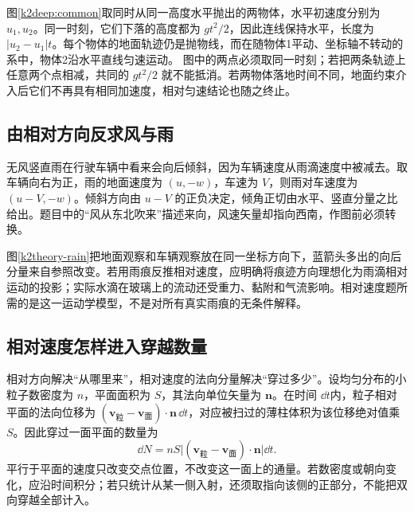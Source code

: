 图\ref{k2deep:common}取同时从同一高度水平抛出的两物体，水平初速度分别为 $u_1,u_2$。同一时刻，它们下落的高度都为 $gt^2/2$，因此连线保持水平，长度为 $|u_2-u_1|t$。每个物体的地面轨迹仍是抛物线，而在随物体1平动、坐标轴不转动的系中，物体2沿水平直线匀速运动。
图中的两点必须取同一时刻；若把两条轨迹上任意两个点相减，共同的 $gt^2/2$ 就不能抵消。若两物体落地时间不同，地面约束介入后它们不再具有相同加速度，相对匀速结论也随之终止。


\subsection{由相对方向反求风与雨}
无风竖直雨在行驶车辆中看来会向后倾斜，因为车辆速度从雨滴速度中被减去。取车辆向右为正，雨的地面速度为 $(u,-w)$，车速为 $V$，则雨对车速度为 $(u-V,-w)$。倾斜方向由 $u-V$ 的正负决定，倾角正切由水平、竖直分量之比给出。题目中的“风从东北吹来”描述来向，风速矢量却指向西南，作图前必须转换。

图\ref{k2theory-rain}把地面观察和车辆观察放在同一坐标方向下，蓝箭头多出的向后分量来自参照改变。若用雨痕反推相对速度，应明确将痕迹方向理想化为雨滴相对运动的投影；实际水滴在玻璃上的流动还受重力、黏附和气流影响。相对速度题所需的是这一运动学模型，不是对所有真实雨痕的无条件解释。

\subsection{相对速度怎样进入穿越数量}
相对方向解决“从哪里来”，相对速度的法向分量解决“穿过多少”。设均匀分布的小粒子数密度为 $n$，平面面积为 $S$，其法向单位矢量为 $\bm n$。在时间 $\dd t$内，粒子相对平面的法向位移为 $(\bm v_{\text{粒}}-\bm v_{\text{面}})\cdot\bm n\,\dd t$，对应被扫过的薄柱体积为该位移绝对值乘 $S$。因此穿过一面平面的数量为
\[\dd N=nS\bigl|(\bm v_{\text{粒}}-\bm v_{\text{面}})\cdot\bm n\bigr|\dd t.\]
平行于平面的速度只改变交点位置，不改变这一面上的通量。若数密度或朝向变化，应沿时间积分；若只统计从某一侧入射，还须取指向该侧的正部分，不能把双向穿越全部计入。

